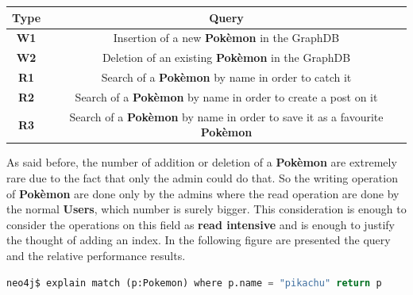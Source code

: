 \begin{center}
	\begin{tabular}{| c | c |} 
		\hline
		\textbf{Type} & \textbf{Query} \\ [0.5ex] 
		\hline
		\textbf{W1} & Insertion of a new \textbf{Pokèmon} in the GraphDB\\ 
		\hline
		\textbf{W2} & Deletion of an existing \textbf{Pokèmon} in the GraphDB \\
		\hline
		\textbf{R1} & Search of a \textbf{Pokèmon} by name in order to catch it \\
		\hline
		\textbf{R2} & Search of a \textbf{Pokèmon} by name in order to create a post on it\\
		\hline
		\textbf{R3} & Search of a \textbf{Pokèmon} by name in order to save it as a favourite \textbf{Pokèmon} \\
		\hline
	\end{tabular}
\end{center}
As said before, the number of addition or deletion of a \textbf{Pokèmon} are extremely rare due to the fact that only the admin could do that. So the writing operation of \textbf{Pokèmon} are done only by the admins where the read operation are done by the normal \textbf{Users}, which number is surely bigger. This consideration is enough to consider the operations on this field as \textbf{read intensive} and is enough to justify the thought of adding an index. In the following figure are presented the query and the relative performance results.
\begin{lstlisting}[language=python]
	neo4j$ explain match (p:Pokemon) where p.name = "pikachu" return p
\end{lstlisting}

